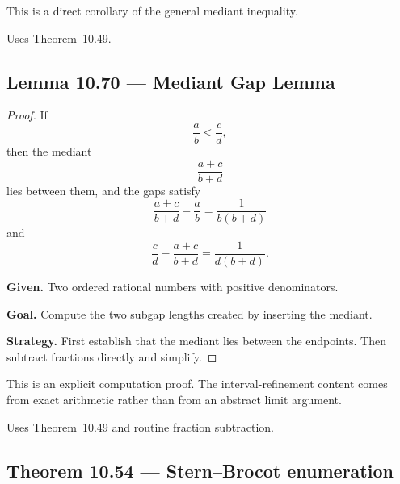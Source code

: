 \begin{remark*}
This is a direct corollary of the general mediant inequality.
\end{remark*}

\begin{remark*}[Dependencies]
Uses Theorem~10.49.
\end{remark*}


\subsection*{Lemma 10.70 — Mediant Gap Lemma}
\label{prf:grep-mediant-gap-lemma}

\begin{proof}
\Claim If
\[
\frac{a}{b} < \frac{c}{d},
\]
then the mediant
\[
\frac{a+c}{b+d}
\]
lies between them, and the gaps satisfy
\[
\frac{a+c}{b+d} - \frac{a}{b} = \frac{1}{b(b+d)}
\]
and
\[
\frac{c}{d} - \frac{a+c}{b+d} = \frac{1}{d(b+d)}.
\]

\textbf{Given.} Two ordered rational numbers with positive denominators.

\textbf{Goal.} Compute the two subgap lengths created by inserting the mediant.

\textbf{Strategy.} First establish that the mediant lies between the endpoints.  Then subtract fractions directly and simplify.


\end{proof}

\begin{remark*}
This is an explicit computation proof.  The interval-refinement content comes
from exact arithmetic rather than from an abstract limit argument.
\end{remark*}

\begin{remark*}[Dependencies]
Uses Theorem~10.49 and routine fraction subtraction.
\end{remark*}


\subsection*{Theorem 10.54 — Stern--Brocot enumeration}
\label{prf:grep-stern-brocot-enumeration}

